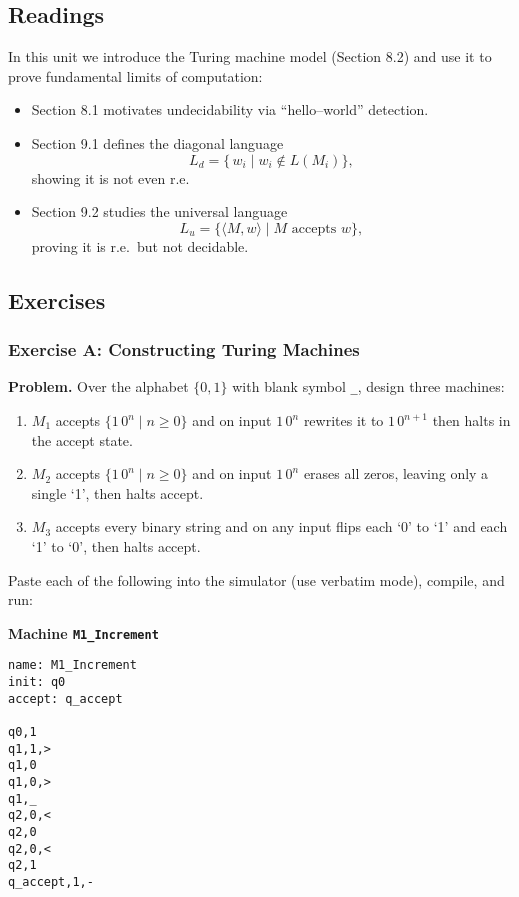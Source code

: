 \documentclass{article}
\theoremstyle{theorem}
\theoremstyle{definition}
\theoremstyle{remark}
\begin{document}
\subsection{Readings}

In this unit we introduce the Turing machine model (Section 8.2) and use it to prove fundamental limits of computation:  
\begin{itemize}
  \item Section 8.1 motivates undecidability via “hello–world” detection.  
  \item Section 9.1 defines the diagonal language 
    \[
      L_{d} = \{\,w_i \mid w_i \notin L(M_i)\},
    \]
    showing it is not even r.e.  
  \item Section 9.2 studies the universal language 
    \[
      L_{u} = \{\langle M,w\rangle \mid M\text{ accepts }w\},
    \]
    proving it is r.e.\ but not decidable.  
\end{itemize}

\subsection{Exercises}

\subsubsection*{Exercise A: Constructing Turing Machines}

\textbf{Problem.}  Over the alphabet \(\{0,1\}\) with blank symbol \texttt{\_}, design three machines:

\begin{enumerate}
  \item \(M_{1}\) accepts \(\{1\,0^n\mid n\ge0\}\) and on input \(1\,0^n\) rewrites it to \(1\,0^{n+1}\) then halts in the accept state.
  \item \(M_{2}\) accepts \(\{1\,0^n\mid n\ge0\}\) and on input \(1\,0^n\) erases all zeros, leaving only a single `1', then halts accept.
  \item \(M_{3}\) accepts every binary string and on any input flips each `0' to `1' and each `1' to `0', then halts accept.
\end{enumerate}

Paste each of the following into the simulator (use verbatim mode), compile, and run:

\bigskip
\noindent\textbf{Machine \texttt{M1\_Increment}}  
\begin{verbatim}
name: M1_Increment
init: q0
accept: q_accept

q0,1
q1,1,>
q1,0
q1,0,>
q1,_
q2,0,<
q2,0
q2,0,<
q2,1
q_accept,1,-
\end{verbatim}
\end{document}
